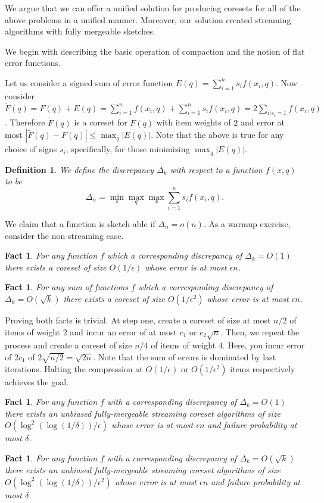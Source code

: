 \documentclass{article} %
\newtheorem{fact}[theorem]{Fact}
\newcommand{\eps}{\epsilon}
\newtheorem{definition}{Definition}
\begin{document}
We argue that we can offer a unified solution for producing coresets for all of the above problems in a unified manner. 
Moreover, our solution created streaming algorithms with fully mergeable sketches. 

We begin with describing the basic operation of compaction and the notion of flat error functions. 

Let us consider a signed sum of error function $E(q) = \sum_{i=1}^{n} s_i f(x_i,q)$.
Now consider $\tilde F(q) = F(q) + E(q) = \sum_{i=1}^{n} f(x_i,q)  + \sum_{i=1}^{n} s_i f(x_i,q)  = 2 \sum_{i | s_i=1} f(x_i,q)$.
Therefore $\tilde F(q)$ is a coreset for $F(q)$ with item weights of $2$ and error at most $|\tilde F(q) - F(q)| \le \max_q | E(q)|$.
Note that the above is true for any choice of signs $s_i$, specifically, for those minimizing $\max_q | E(q)|$.
\begin{definition}
We define the discrepancy $\Delta_k$ with respect to a function $f(x,q)$ to be  
\[\Delta_n = \min_s \max_q \max_x \sum_{i=1}^{n} s_i f(x_i,q). \] 
\end{definition}
\noindent We claim that a function is sketch-able if $\Delta_n = o(n)$. 
As a warmup exercise, consider the non-streaming case.
\begin{fact}
For any function $f$ which a corresponding discrepancy of $\Delta_k = O(1)$ there exists a coreset of size 
$O(1/\eps)$ whose error is at most $\eps n$.
\end{fact}
\begin{fact}
For any sum of functions $f$ which a corresponding discrepancy of $\Delta_k = O(\sqrt{k})$ there exists a coreset of size 
$O(1/\eps^2)$ whose error is at most $\eps n$.
\end{fact}

\noindent Proving both facts is trivial. 
At step one, create a coreset of size at most $n/2$ of items of weight $2$ and incur an error of at most $c_1$ or $c_2 \sqrt{n}$.
Then, we repeat the process and create a coreset of size $n/4$ of items of weight $4$. Here, you incur error of $2c_1$ of $2\sqrt{n/2}  = \sqrt{2n}$.
Note that the sum of errors is dominated by last iterations. 
Halting the compression at $O(1/\eps)$ or $O(1/\eps^2)$ items respectively achieves the goal.
 

\begin{fact}
For any function $f$ with a corresponding discrepancy of $\Delta_k = O(1)$ there exists an unbiased fully-mergeable streaming coreset algorithms of size 
$O(\log^2(\log(1/\delta))/\eps)$ whose error is at most $\eps n$ and failure probability at most $\delta$.
\end{fact}
\begin{fact}
For any function $f$ with a corresponding discrepancy of $\Delta_k = O(\sqrt{k})$ there exists an unbiased fully-mergeable streaming coreset algorithms of size 
$O(\log^2(\log(1/\delta))/\eps^2)$ whose error is at most $\eps n$ and failure probability at most $\delta$.
\end{fact}
\end{document}
